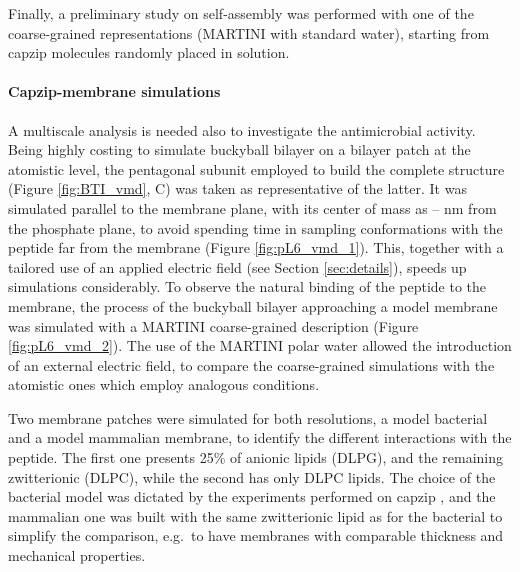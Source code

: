 Finally, a preliminary study on self-assembly was performed with one of the coarse-grained representations (MARTINI with standard water), starting from capzip molecules randomly placed in solution.

\paragraph{Capzip-membrane simulations} A multiscale analysis is needed also to investigate the antimicrobial activity. Being highly costing to simulate buckyball bilayer on a bilayer patch at the atomistic level, the pentagonal subunit employed to build the complete structure (Figure \ref{fig:BTI_vmd}, C) was taken as representative of the latter. It was simulated parallel to the membrane plane, with its center of mass as -- nm from the phosphate plane, to avoid spending time in sampling conformations with the peptide far from the membrane (Figure \ref{fig:pL6_vmd_1}). This, together with a tailored use of an applied electric field (see Section \ref{sec:details}), speeds up simulations considerably.
%
To observe the natural binding of the peptide to the membrane, the process of the buckyball bilayer approaching a model membrane was simulated with a MARTINI coarse-grained description (Figure \ref{fig:pL6_vmd_2}). The use of the MARTINI polar water \citep{Yesylevskyy2010} allowed the introduction of an external electric field, to compare the coarse-grained simulations with the atomistic ones which employ analogous conditions.

Two membrane patches were simulated for both resolutions, a model bacterial and a model mammalian membrane, to identify the different interactions with the peptide. The first one presents 25\% of anionic lipids (DLPG), and the remaining zwitterionic (DLPC), while the second has only DLPC lipids. The choice of the bacterial model was dictated by the experiments performed on capzip \citep{Castelletto2016}, and the mammalian one was built with the same zwitterionic lipid as for the bacterial to simplify the comparison, e.g.\ to have membranes with comparable thickness and mechanical properties.

